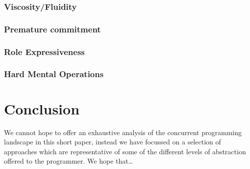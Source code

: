 \documentclass{sig-alternate}
\begin{document}
\subsubsection{Viscosity/Fluidity}

\subsubsection{Premature commitment}

\subsubsection{Role Expressiveness}

\subsubsection{Hard Mental Operations}

\section{Conclusion}

We cannot hope to offer an exhaustive analysis of the concurrent
programming landscape in this short paper, instead we have focussed on
a selection of approaches which are representative of some of the
different levels of abstraction offered to the programmer. We hope
that\ldots





\end{document}
